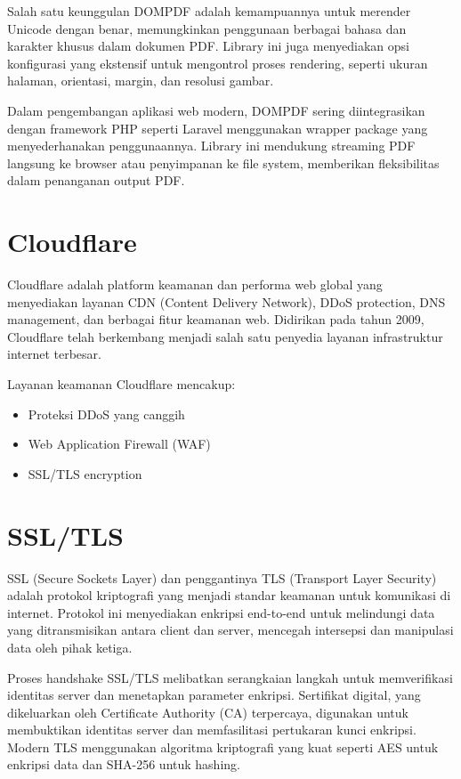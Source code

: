\documentclass[a4paper,12pt]{report}
\begin{document}
Salah satu keunggulan DOMPDF adalah kemampuannya untuk merender Unicode dengan benar, memungkinkan penggunaan berbagai bahasa dan karakter khusus dalam dokumen PDF. Library ini juga menyediakan opsi konfigurasi yang ekstensif untuk mengontrol proses rendering, seperti ukuran halaman, orientasi, margin, dan resolusi gambar.

Dalam pengembangan aplikasi web modern, DOMPDF sering diintegrasikan dengan framework PHP seperti Laravel menggunakan wrapper package yang menyederhanakan penggunaannya. Library ini mendukung streaming PDF langsung ke browser atau penyimpanan ke file system, memberikan fleksibilitas dalam penanganan output PDF.

\section{Cloudflare}
Cloudflare adalah platform keamanan dan performa web global yang menyediakan 
layanan CDN (Content Delivery Network), DDoS protection, DNS management, 
dan berbagai fitur keamanan web. Didirikan pada tahun 2009, Cloudflare 
telah berkembang menjadi salah satu penyedia layanan infrastruktur 
internet terbesar.

Layanan keamanan Cloudflare mencakup:
\begin{itemize}
\item Proteksi DDoS yang canggih
\item Web Application Firewall (WAF)
\item SSL/TLS encryption
\end{itemize}

\section{SSL/TLS}
SSL (Secure Sockets Layer) dan penggantinya TLS (Transport Layer Security) adalah protokol kriptografi yang menjadi standar keamanan untuk komunikasi di internet. Protokol ini menyediakan enkripsi end-to-end untuk melindungi data yang ditransmisikan antara client dan server, mencegah intersepsi dan manipulasi data oleh pihak ketiga.

Proses handshake SSL/TLS melibatkan serangkaian langkah untuk memverifikasi identitas server dan menetapkan parameter enkripsi. Sertifikat digital, yang dikeluarkan oleh Certificate Authority (CA) terpercaya, digunakan untuk membuktikan identitas server dan memfasilitasi pertukaran kunci enkripsi. Modern TLS menggunakan algoritma kriptografi yang kuat seperti AES untuk enkripsi data dan SHA-256 untuk hashing.
\end{document}
